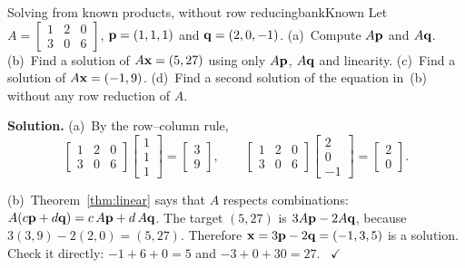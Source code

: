 \documentclass[11pt]{article}
\begin{document}
\begin{exmp}{Solving from known products, without row reducing}{bankKnown}
Let $A=\begin{bmatrix}1&2&0\\3&0&6\end{bmatrix}$, $\mathbf{p}=(1,1,1)$ and $\mathbf{q}=(2,0,-1)$. (a)~Compute $A\mathbf{p}$ and $A\mathbf{q}$. (b)~Find a solution of $A\mathbf{x}=(5,27)$ using only $A\mathbf{p}$, $A\mathbf{q}$ and linearity. (c)~Find a solution of $A\mathbf{x}=(-1,9)$. (d)~Find a second solution of the equation in~(b) without any row reduction of $A$.

\textbf{Solution.} (a)~By the row--column rule,
\[
\begin{bmatrix}1&2&0\\3&0&6\end{bmatrix}\begin{bmatrix}1\\1\\1\end{bmatrix}=\begin{bmatrix}3\\9\end{bmatrix},\qquad
\begin{bmatrix}1&2&0\\3&0&6\end{bmatrix}\begin{bmatrix}2\\0\\-1\end{bmatrix}=\begin{bmatrix}2\\0\end{bmatrix}.
\]

(b)~Theorem~\ref{thm:linear} says that $A$ respects combinations: $A(c\mathbf{p}+d\mathbf{q})=c\,A\mathbf{p}+d\,A\mathbf{q}$. The target $(5,27)$ is $3A\mathbf{p}-2A\mathbf{q}$, because $3(3,9)-2(2,0)=(5,27)$. Therefore $\mathbf{x}=3\mathbf{p}-2\mathbf{q}=(-1,3,5)$ is a solution. Check it directly: $-1+6+0=5$ and $-3+0+30=27$. \ $\checkmark$


\end{exmp}
\end{document}
